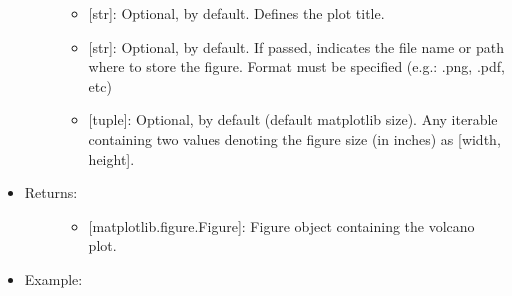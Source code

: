 \documentclass[letterpaper,10pt,english]{sphinxmanual}
\begin{document}
\begin{fulllineitems}
\begin{itemize}
\begin{description}
\begin{itemize}
\item {} 
 {[}str{]}: Optional,  by default. Defines the plot
title.

\item {} 
 {[}str{]}: Optional,  by default. If passed,
indicates the file name or path where to store the figure.
Format must be specified (e.g.: .png, .pdf, etc)

\item {} 
 {[}tuple{]}: Optional,  by default (default
matplotlib size). Any iterable containing two values denoting
the figure size (in inches) as {[}width, height{]}.

\end{itemize}

\end{description}

\item {} \begin{description}
\item[{Returns:}] \leavevmode\begin{itemize}
\item {} 
{[}matplotlib.figure.Figure{]}: Figure object containing the
volcano plot.

\end{itemize}

\end{description}

\item {} \begin{description}
\item[{Example:}] \leavevmode
{}%
\begin{sphinxVerbatim}[commandchars=\\\{\}]
 
\end{sphinxVerbatim}


\end{description}

\end{itemize}

\end{fulllineitems}
\end{document}
